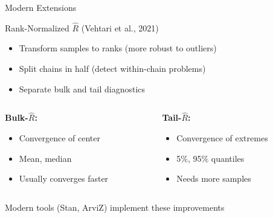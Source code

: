 \begin{frame}{Modern Extensions}
	\begin{block}{Rank-Normalized $\hat{R}$ (Vehtari et al., 2021)}
		\begin{itemize}
			\item Transform samples to ranks (more robust to outliers)
			\item Split chains in half (detect within-chain problems)
			\item Separate bulk and tail diagnostics
		\end{itemize}
	\end{block}

	\vspace{0.5cm}
	\begin{columns}
		\begin{column}{0.5\textwidth}
			\textbf{Bulk-$\hat{R}$:}
			\begin{itemize}
				\item Convergence of center
				\item Mean, median
				\item Usually converges faster
			\end{itemize}
		\end{column}
		\begin{column}{0.5\textwidth}
			\textbf{Tail-$\hat{R}$:}
			\begin{itemize}
				\item Convergence of extremes
				\item 5\%, 95\% quantiles
				\item Needs more samples
			\end{itemize}
		\end{column}
	\end{columns}

	\vspace{0.5cm}
	\begin{center}
		\color{copenhagenred} Modern tools (Stan, ArviZ) implement these improvements
	\end{center}
\end{frame}


